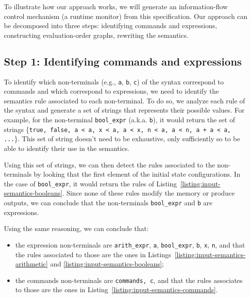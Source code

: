 \documentclass[conference]{IEEEtran}
\begin{document}
To illustrate how our approach works, we will generate an information-flow control mechanism (a runtime monitor) from this specification. Our approach can be decomposed into three steps: identifying commands and expressions, constructing evaluation-order graphs, rewriting the semantics.

\subsection{Step 1: Identifying commands and expressions}
To identify which non-terminals (e.g., \lstinline{a}, \lstinline{b}, \lstinline{c}) of the syntax correspond to commands and which correspond to expressions, we need to identify the semantics rule associated to each non-terminal. To do so, we analyze each rule of the syntax and generate a set of strings that represents their possible values. For example, for the non-terminal \lstinline{bool_expr} (a.k.a. \lstinline{b}), it would return the set of strings \{\lstinline{true, false, a < a, x < a, a < x, n < a, a < n, a + a < a, ...}\}. This set of string doesn't need to be exhaustive, only sufficiently so to be able to identify their use in the semantics. 

Using this set of strings, we can then detect the rules associated to the non-terminals by looking that the first element of the initial state configurations. In the case of \lstinline{bool_expr}, it would return the rules of Listing~\ref{listing:input-semantics-booleans}. Since none of these rules modify the memory or produce outputs, we can conclude that the non-terminals \lstinline{bool_expr} and \lstinline{b} are expressions.

Using the same reasoning, we can conclude that:
\begin{itemize}
	\item the expression non-terminals are \lstinline{arith_expr}, \lstinline{a}, \lstinline{bool_expr}, \lstinline{b}, \lstinline{x}, \lstinline{n}, and that the rules associated to those are the ones in Listings~\ref{listing:input-semantics-arithmetic} and \ref{listing:input-semantics-booleans};
	\item the commands non-terminals are \lstinline{commands, c}, and that the rules associates to those are the ones in Listing~\ref{listing:input-semantics-commands}.
\end{itemize}
\end{document}
